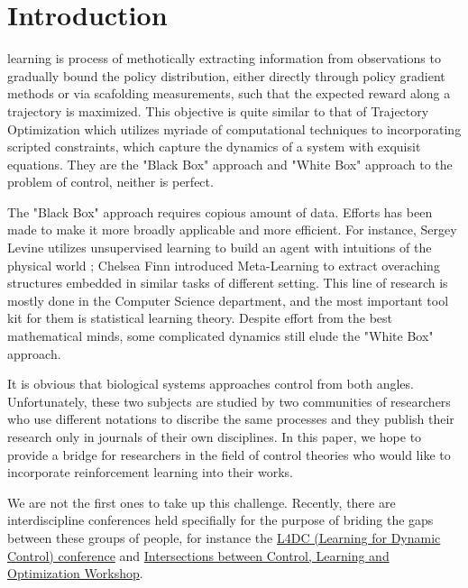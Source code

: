 \documentclass[journal]{IEEEtran}
\begin{document}
\section{Introduction}
 learning is process of methotically extracting information from observations to gradually bound the policy distribution, either directly through policy gradient methods or via scafolding measurements, such that the expected reward along a trajectory is maximized. This objective is quite similar to that of Trajectory Optimization which utilizes myriade of computational techniques to incorporating scripted constraints, which capture the dynamics of a system with exquisit equations. They are the "Black Box" approach and "White Box" approach to the problem of control, neither is perfect.

The "Black Box" approach requires copious amount of data. Efforts has been made to make it more broadly applicable and more efficient. For instance, Sergey Levine utilizes unsupervised learning to build an agent with intuitions of the physical world \cite{Finn2016UnsupervisedLF}; Chelsea Finn introduced Meta-Learning \cite{Finn2017ModelAgnosticMF} to extract overaching structures embedded in similar tasks of different setting. This line of research is mostly done in the Computer Science department, and the most important tool kit for them is statistical learning theory. Despite effort from the best mathematical minds, some complicated dynamics still elude the "White Box" approach.

It is obvious that biological systems approaches control from both angles. Unfortunately, these two subjects are studied by two communities of researchers who use different notations to discribe the same processes and they publish their research only in journals of their own disciplines. In this paper, we hope to provide a bridge for researchers in the field of control theories who would like to incorporate reinforcement learning into their works.

We are not the first ones to take up this challenge. Recently, there are interdiscipline conferences held specifially for the purpose of briding the gaps between these groups of people, for instance the \href{https://l4dc.mit.edu/}{L4DC (Learning for Dynamic Control) conference} and \href{https://www.ipam.ucla.edu/programs/workshops/intersections-between-control-learning-and-optimization/}{Intersections between Control, Learning and Optimization Workshop}.
\end{document}
